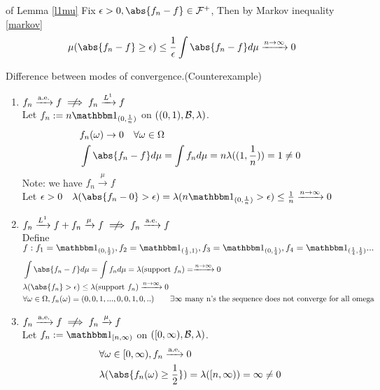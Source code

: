 \pf of Lemma \ref{l1mu} Fix $\epsilon >0, \abs{f_n - f}\in \F^+$, Then by Markov inequality \ref{markov}
\begin{equation*}
    \mu(\abs{f_n-f} \geq \epsilon) \leq \frac{1}{\epsilon}\int \abs{f_n-f} d\mu \xrightarrow{n\rightarrow \infty} 0
\end{equation*}
\newpage
\begin{example}Difference between modes of convergence.(Counterexample)
\begin{enumerate}
    \item $f_n \xrightarrow{\text{a.e.}}f \notimplies f_n \xrightarrow{\ls{1}}f$ \\
    Let $f_n := n \I_{(0,\frac{1}{n})}$ on $((0,1),\mathcal{B}, \lambda)$.
    \begin{align*}
        &f_n(\omega) \rightarrow 0 \quad \forall \omega \in \Omega \\
        &\int \abs{f_n - f} d\mu = \int f_n d\mu = n\lambda((1, \frac{1}{n})) = 1 \neq 0
    \end{align*}Note: we have $f_n \xrightarrow{\mu}f$ \\
    Let $\epsilon > 0\quad \lambda(\abs{f_n-0} > \epsilon) = \lambda(n\I_{(0,\frac{1}{n})} > \epsilon) \leq \frac{1}{n} \xrightarrow{n \rightarrow \infty}  0$
    \item $f_n \xrightarrow{\ls{1}}f + f_n \xrightarrow{\mu}f \notimplies f_n \xrightarrow{\text{a.e.}}f$ \\
    Define $f: f_1 = \I_{(0,\frac{1}{2})}, f_2 = \I_{(\frac{1}{2},1)}, f_3 = \I_{(0,\frac{1}{4})}, f_4 = \I_{(\frac{1}{4},\frac{1}{2})} ...$
    \begin{align*}
        &\int \abs{f_n - f} d\mu = \int f_n d\mu = \lambda(\text{support }f_n) = \xrightarrow{n \rightarrow \infty}  0 \\
        &\lambda(\abs{f_n} > \epsilon) \leq \lambda(\text{support }f_n) \xrightarrow{n \rightarrow \infty}  0 \\
        &\forall \omega\in\Omega, f_n(\omega) = (0,0,1,...,0,0,1,0,..)\qquad \exists\infty \text{ many n's the sequence does not converge for all omega}
    \end{align*}
    \item $f_n \xrightarrow{\text{a.e.}}f \notimplies f_n \xrightarrow{\mu}f$ \\
    Let $f_n := \I_{[n,\infty)}$ on $([0,\infty),\mathcal{B}, \lambda)$.
    \begin{align*}
       & \forall \omega\in [0,\infty), f_n \xrightarrow{\text{a.e.}} 0 \\
       &\lambda(\abs{f_n(\omega) \geq \frac{1}{2}}) = \lambda([n,\infty)) =\infty \neq 0 \\
    \end{align*}
\end{enumerate}
\end{example}
